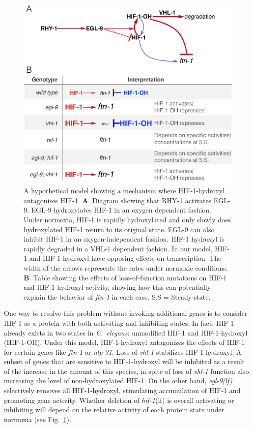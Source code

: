 \documentclass[9pt,twocolumn,twoside]{pnas-new}
\newcommand{\cel}{\emph{C.~elegans}}
\newcommand{\gene}[1]{\emph{#1}}
\newcommand{\nlp}{\emph{\mbox{nlp-31}}}
\newcommand{\ftna}{\emph{\mbox{ftn-1}}}
\newcommand{\egl}{\emph{\mbox{egl-9}(lf)}}
\newcommand{\hif}{\emph{\mbox{hif-1}}(lf)}
\newcommand{\hifp}{HIF-1}
\begin{document}
\begin{figure}[tbhp]
\centering
\includegraphics[width=\linewidth]{figs/hif1oh_model.pdf}
\caption{
A hypothetical model showing a mechanism where \hifp{}-hydroxyl antagonises
\hifp{}.
\textbf{A}. Diagram showing that RHY-1 activates EGL-9.
EGL-9 hydroxylates HIF-1 in an oxygen dependent fashion. Under normoxia, HIF-1
is rapidly hydroxylated and only slowly does hydroxylated HIF-1 return to its
original state. EGL-9 can also inhibit HIF-1 in an oxygen-independent fashion.
HIF-1 hydroxyl is rapidly degraded in a VHL-1 dependent fashion. In our model,
HIF-1 and HIF-1 hydroxyl have opposing effects on transcription. The width of the
arrows represents the rates under normoxic conditions.
\textbf{B}. Table showing the effects of loss-of-function mutations on HIF-1 and
HIF-1 hydroxyl activity, showing how this can potentially explain the behavior
of \gene{ftn-1} in each case.  S.S = Steady-state.
}
\label{fig:hif1oh_table}
\end{figure}

One way to resolve this problem without invoking additional genes is to
consider \hifp{} as a protein with both activating and inhibiting states. In fact,
\hifp{} already exists in two states in \cel{}: unmodified \hifp{} and
\hifp{}-hydroxyl (\hifp{}-OH). Under this model, \hifp{}-hydroxyl antagonizes
the effects of \hifp{} for certain genes like \ftna{} or \nlp{}. Loss of
\gene{vhl-1} stabilizes \hifp{}-hydroxyl.
A subset of genes that are sensitive to \hifp{}-hydroxyl will be inhibited as a
result of the increase in the amount of this species, in spite of loss of
\gene{vhl-1} function also increasing the level of non-hydroxylated \hifp{}.
On the other hand, \egl{} selectively removes all \hifp{}-hydroxyl, stimulating
accumulation of \hifp{} and promoting gene activity. Whether deletion of \hif{}
is overall activating or inhibiting will depend on the relative activity of each
protein state under normoxia (see Fig.~\ref{fig:hif1oh_table}).
\end{document}
